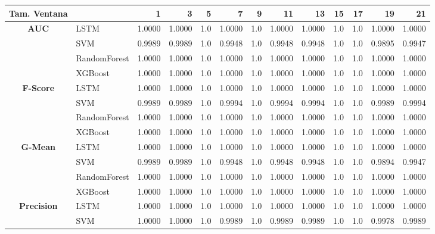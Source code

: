 \begin{table}[h]
	\centering
	\begin{adjustbox}{max width=15cm}
		\begin{tabular}{|c|l|r|r|r|r|r|r|r|r|r|r|r|}
			\hline
			\textbf{Tam. Ventana}&         &      1  &      3  &   5  &      7  &   9  &      11 &      13 &   15 &   17 &      19 &      21 \\
			\hline
			\textbf{AUC} & LSTM &  1.0000 &  1.0000 &  1.0 &  1.0000 &  1.0 &  1.0000 &  1.0000 &  1.0 &  1.0 &  1.0000 &  1.0000 \\
			& SVM &  0.9989 &  0.9989 &  1.0 &  0.9948 &  1.0 &  0.9948 &  0.9948 &  1.0 &  1.0 &  0.9895 &  0.9947 \\
			& RandomForest &  1.0000 &  1.0000 &  1.0 &  1.0000 &  1.0 &  1.0000 &  1.0000 &  1.0 &  1.0 &  1.0000 &  1.0000 \\
			& XGBoost &  1.0000 &  1.0000 &  1.0 &  1.0000 &  1.0 &  1.0000 &  1.0000 &  1.0 &  1.0 &  1.0000 &  1.0000 \\
			\hline
			\textbf{F-Score} & LSTM &  1.0000 &  1.0000 &  1.0 &  1.0000 &  1.0 &  1.0000 &  1.0000 &  1.0 &  1.0 &  1.0000 &  1.0000 \\
			& SVM &  0.9989 &  0.9989 &  1.0 &  0.9994 &  1.0 &  0.9994 &  0.9994 &  1.0 &  1.0 &  0.9989 &  0.9994 \\
			& RandomForest &  1.0000 &  1.0000 &  1.0 &  1.0000 &  1.0 &  1.0000 &  1.0000 &  1.0 &  1.0 &  1.0000 &  1.0000 \\
			& XGBoost &  1.0000 &  1.0000 &  1.0 &  1.0000 &  1.0 &  1.0000 &  1.0000 &  1.0 &  1.0 &  1.0000 &  1.0000 \\
			\hline
			\textbf{G-Mean} & LSTM &  1.0000 &  1.0000 &  1.0 &  1.0000 &  1.0 &  1.0000 &  1.0000 &  1.0 &  1.0 &  1.0000 &  1.0000 \\
			& SVM &  0.9989 &  0.9989 &  1.0 &  0.9948 &  1.0 &  0.9948 &  0.9948 &  1.0 &  1.0 &  0.9894 &  0.9947 \\
			& RandomForest &  1.0000 &  1.0000 &  1.0 &  1.0000 &  1.0 &  1.0000 &  1.0000 &  1.0 &  1.0 &  1.0000 &  1.0000 \\
			& XGBoost &  1.0000 &  1.0000 &  1.0 &  1.0000 &  1.0 &  1.0000 &  1.0000 &  1.0 &  1.0 &  1.0000 &  1.0000 \\
			\hline
			\textbf{Precision} & LSTM &  1.0000 &  1.0000 &  1.0 &  1.0000 &  1.0 &  1.0000 &  1.0000 &  1.0 &  1.0 &  1.0000 &  1.0000 \\
			& SVM &  1.0000 &  1.0000 &  1.0 &  0.9989 &  1.0 &  0.9989 &  0.9989 &  1.0 &  1.0 &  0.9978 &  0.9989 \\

\end{tabular}
\end{adjustbox}
\end{table}
